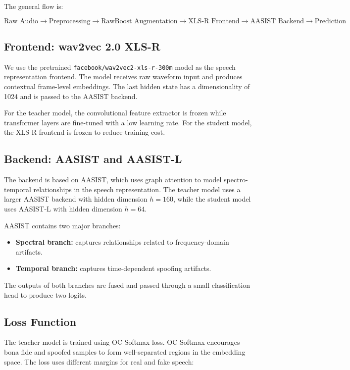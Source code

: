 \documentclass[sigconf]{acmart}
\begin{document}
The general flow is:

\[
\text{Raw Audio}
\rightarrow
\text{Preprocessing}
\rightarrow
\text{RawBoost Augmentation}
\rightarrow
\text{XLS-R Frontend}
\rightarrow
\text{AASIST Backend}
\rightarrow
\text{Prediction}
\]

\subsection{Frontend: wav2vec 2.0 XLS-R}

We use the pretrained \texttt{facebook/wav2vec2-xls-r-300m} model as the speech representation frontend. The model receives raw waveform input and produces contextual frame-level embeddings. The last hidden state has a dimensionality of 1024 and is passed to the AASIST backend.

For the teacher model, the convolutional feature extractor is frozen while transformer layers are fine-tuned with a low learning rate. For the student model, the XLS-R frontend is frozen to reduce training cost.

\subsection{Backend: AASIST and AASIST-L}

The backend is based on AASIST, which uses graph attention to model spectro-temporal relationships in the speech representation. The teacher model uses a larger AASIST backend with hidden dimension $h=160$, while the student model uses AASIST-L with hidden dimension $h=64$.

AASIST contains two major branches:
\begin{itemize}
    \item \textbf{Spectral branch:} captures relationships related to frequency-domain artifacts.
    \item \textbf{Temporal branch:} captures time-dependent spoofing artifacts.
\end{itemize}

The outputs of both branches are fused and passed through a small classification head to produce two logits.

\subsection{Loss Function}

The teacher model is trained using OC-Softmax loss. OC-Softmax encourages bona fide and spoofed samples to form well-separated regions in the embedding space. The loss uses different margins for real and fake speech:
\end{document}
